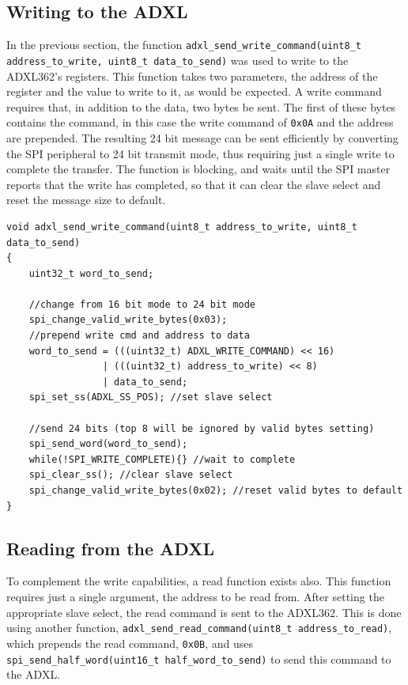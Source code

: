 \documentclass[11pt,british]{report}
\begin{document}
\subsection*{Writing to the ADXL}
In the previous section, the function \lstinline[style={c-style}]|adxl_send_write_command(uint8_t address_to_write, uint8_t data_to_send)| was used to write to the ADXL362's registers. This function takes two parameters, the address of the register and the value to write to it, as would be expected. A write command requires that, in addition to the data, two bytes be sent. The first of these bytes contains the command, in this case the write command of \texttt{0x0A} and the address are prepended. The resulting 24 bit message can be sent efficiently by converting the SPI peripheral to 24 bit transmit mode, thus requiring just a single write to complete the transfer. The function is blocking, and waits until the SPI master reports that the write has completed, so that it can clear the slave select and reset the message size to default.
\begin{lstlisting}[style={c-style}]
void adxl_send_write_command(uint8_t address_to_write, uint8_t data_to_send)
{
	uint32_t word_to_send;
	
	//change from 16 bit mode to 24 bit mode
	spi_change_valid_write_bytes(0x03);
	//prepend write cmd and address to data
	word_to_send = (((uint32_t) ADXL_WRITE_COMMAND) << 16)
	             | (((uint32_t) address_to_write) << 8)
	             | data_to_send; 
	spi_set_ss(ADXL_SS_POS); //set slave select
	
	//send 24 bits (top 8 will be ignored by valid bytes setting)
	spi_send_word(word_to_send);
	while(!SPI_WRITE_COMPLETE){} //wait to complete
	spi_clear_ss(); //clear slave select
	spi_change_valid_write_bytes(0x02); //reset valid bytes to default
}
\end{lstlisting}

\subsection*{Reading from the ADXL}
To complement the write capabilities, a read function exists also. This function requires just a single argument, the address to be read from. After setting the appropriate slave select, the read command is sent to the ADXL362. This is done using another function, \lstinline[style={c-style}]|adxl_send_read_command(uint8_t address_to_read)|, which prepends the read command, \texttt{0x0B}, and uses \lstinline[style={c-style}]|spi_send_half_word(uint16_t half_word_to_send)| to send this command to the ADXL.
\end{document}
